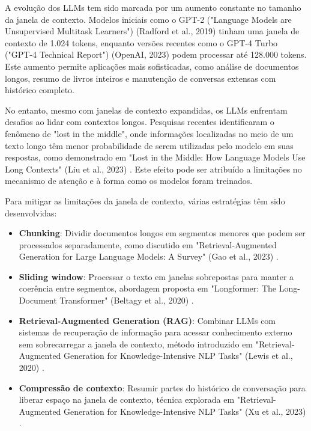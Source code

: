 \documentclass[tcc,capa]{texufpel}
\begin{document}
A evolução dos LLMs tem sido marcada por um aumento constante no tamanho da janela de contexto. Modelos iniciais como o GPT-2 ("Language Models are Unsupervised Multitask Learners") (Radford et al., 2019) \cite{radford2019language} tinham uma janela de contexto de 1.024 tokens, enquanto versões recentes como o GPT-4 Turbo ("GPT-4 Technical Report") (OpenAI, 2023) \cite{openai2023gpt4} podem processar até 128.000 tokens. Este aumento permite aplicações mais sofisticadas, como análise de documentos longos, resumo de livros inteiros e manutenção de conversas extensas com histórico completo.

No entanto, mesmo com janelas de contexto expandidas, os LLMs enfrentam desafios ao lidar com contextos longos. Pesquisas recentes identificaram o fenômeno de "lost in the middle", onde informações localizadas no meio de um texto longo têm menor probabilidade de serem utilizadas pelo modelo em suas respostas, como demonstrado em "Lost in the Middle: How Language Models Use Long Contexts" (Liu et al., 2023) \cite{liu2023lost}. Este efeito pode ser atribuído a limitações no mecanismo de atenção e à forma como os modelos foram treinados.

Para mitigar as limitações da janela de contexto, várias estratégias têm sido desenvolvidas:

\begin{itemize}
    \item \textbf{Chunking}: Dividir documentos longos em segmentos menores que podem ser processados separadamente, como discutido em "Retrieval-Augmented Generation for Large Language Models: A Survey" (Gao et al., 2023) \cite{gao2023retrieval}.
    
    \item \textbf{Sliding window}: Processar o texto em janelas sobrepostas para manter a coerência entre segmentos, abordagem proposta em "Longformer: The Long-Document Transformer" (Beltagy et al., 2020) \cite{beltagy2020longformer}.
    
    \item \textbf{Retrieval-Augmented Generation (RAG)}: Combinar LLMs com sistemas de recuperação de informação para acessar conhecimento externo sem sobrecarregar a janela de contexto, método introduzido em "Retrieval-Augmented Generation for Knowledge-Intensive NLP Tasks" (Lewis et al., 2020) \cite{lewis2020retrieval}.
    
    \item \textbf{Compressão de contexto}: Resumir partes do histórico de conversação para liberar espaço na janela de contexto, técnica explorada em "Retrieval-Augmented Generation for Knowledge-Intensive NLP Tasks" (Xu et al., 2023) \cite{xu2023retrieval}.
\end{itemize}
\end{document}
